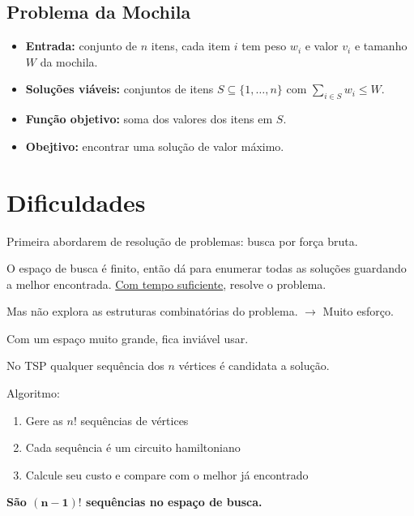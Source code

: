 \subsection{Problema da Mochila}

\begin{itemize}
    \item \textbf{Entrada:} conjunto de $n$ itens, cada item $i$ tem peso $w_i$ e valor $v_i$ e tamanho $W$ da mochila.
    \item \textbf{Soluções viáveis:} conjuntos de itens $S \subseteq \{1,\dots,n\}$ com $\sum_{i \in S} w_i \leq W$.
    \item \textbf{Função objetivo:} soma dos valores dos itens em $S$.
    \item \textbf{Obejtivo:} encontrar uma solução de valor máximo.
\end{itemize}

\section{Dificuldades}

Primeira abordarem de resolução de problemas: busca por força bruta.

O espaço de busca é finito, então dá para enumerar todas as soluções guardando a melhor encontrada. \underline{Com tempo suficiente}, resolve o problema.

Mas não explora as estruturas combinatórias do problema. $\to$ Muito esforço.

Com um espaço muito grande, fica inviável usar.

\begin{example}
    No TSP qualquer sequência dos $n$ vértices é candidata a solução.

    \vspace{\baselineskip}
    Algoritmo:
    \begin{enumerate}
        \item Gere as $n!$ sequências de vértices
        \item Cada sequência é um circuito hamiltoniano
        \item Calcule seu custo e compare com o melhor já encontrado
    \end{enumerate}

    \textbf{São $\mathbf{(n-1)!}$ sequências no espaço de busca.}
\end{example}

